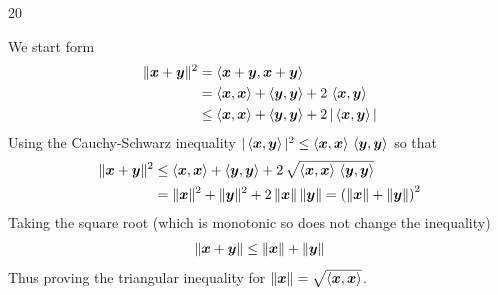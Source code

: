 \documentclass{sotonExamBoxes}    %
\begin{document}
\begin{question}{20}
\begin{qparts}
\begin{answer}
      We start form
      \begin{align*}
        \| \bm{x}+\bm{y} \|^2
        &=  \left\langle \bm{x} + \bm{y}, \bm{x} + \bm{y}\right\rangle
        \\
        &=  \left\langle \bm{x}, \bm{x}\right\rangle + \left\langle \bm{y}, \bm{y}\right\rangle
          + 2 \, \left\langle \bm{x}, \bm{y}\right\rangle
        \\
        &\leq \left\langle \bm{x}, \bm{x}\right\rangle + \left\langle \bm{y}, \bm{y}\right\rangle
          + 2 \, |\left\langle \bm{x}, \bm{y}\right\rangle|
      \end{align*}
      Using the Cauchy-Schwarz inequality $|\left\langle \bm{x}, \bm{y}\right\rangle|^2
      \leq \left\langle \bm{x}, \bm{x}\right\rangle\, \left\langle \bm{y}, \bm{y}\right\rangle$ so that
      \begin{align*}
         \| \bm{x}+\bm{y} \|^2
        &\leq  \left\langle \bm{x}, \bm{x}\right\rangle + \left\langle \bm{y}, \bm{y}\right\rangle
          + 2 \, \sqrt{\left\langle \bm{x}, \bm{x}\right\rangle\, \left\langle \bm{y}, \bm{y}\right\rangle}
        \\
        &= \| \bm{x} \|^2 + \| \bm{y} \|^2 + 2 \,
          \| \bm{x} \|\,\| \bm{y} \|
        = \left( \| \bm{x} \| + \| \bm{y} \|\right)^2
      \end{align*}
      Taking the square root (which is monotonic so does not change
      the inequality)
      \begin{align*}
         \| \bm{x}+\bm{y} \| \leq  \| \bm{x} \| + \| \bm{y} \|
      \end{align*}
      Thus proving the triangular inequality for
      $\| \bm{x} \| = \sqrt{\left\langle \bm{x}, \bm{x}\right\rangle}$. 
    \end{answer}
  \end{qparts}
\end{question}
\freshpage

\end{document}
